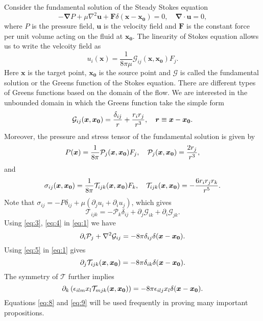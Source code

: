 \documentclass[12pt]{article}
\begin{document}
Consider the fundamental solution of the Steady Stokes equation
\begin{equation}
	\label{eq:1}
	-\boldsymbol{\nabla} P + \mu \nabla^2 \textbf{u} + \textbf{F} \delta(\boldsymbol{x}-\boldsymbol{x_0}) = 0, \quad
	\boldsymbol{\nabla}\cdot \textbf{u} = 0,
\end{equation}
where $P$ is the pressure field, $\textbf{u}$ is the velocity field and $\textbf{F}$ is the constant force per unit volume acting on the fluid at $\boldsymbol{x_0}$. The linearity of Stokes equation allows us to write the velcoity field as
\begin{equation}
	\label{eq:2}
	u_i(\boldsymbol{x}) = \frac{1}{8\pi\mu} \mathcal{G}_{ij}(\boldsymbol{x},\boldsymbol{x_0}) F_j.
\end{equation}
Here $\boldsymbol{x}$ is the target point, $\boldsymbol{x_0}$ is the source point and $\boldsymbol{\mathcal{G}}$ is called the fundamental solution or the Greens function of the Stokes equation. There are different types of Greens functions based on the domain of the flow. We are interested in the unbounded domain in which the Greens function take the simple form
\begin{equation}
	\label{eq:3}
	\mathcal{G}_{ij}(\boldsymbol{x}, \boldsymbol{x_0}) = \frac{\delta_{ij}}{r} + \frac{r_i r_j}{r^3}, \quad \boldsymbol{r}\equiv \boldsymbol{x} - \boldsymbol{x_0}. 
\end{equation}
Moreover, the pressure and stress tensor of the fundamental solution is given by
\begin{equation}
	\label{eq:4}
	P(\boldsymbol{x}) = \frac{1}{8\pi} \mathcal{P}_j(\boldsymbol{x},\boldsymbol{x_0}) F_j, \quad \mathcal{P}_j(\boldsymbol{x},\boldsymbol{x_0}) = \frac{2 r_j}{r^3},
\end{equation}
and 
\begin{equation}
	\label{eq:5}
	\sigma_{ij}(\boldsymbol{x},\boldsymbol{x_0}) = \frac{1}{8\pi} \mathcal{T}_{ijk}(\boldsymbol{x},\boldsymbol{x_0}) F_k, \quad \mathcal{T}_{ijk}(\boldsymbol{x},\boldsymbol{x_0}) = -\frac{6 r_i r_j r_k}{r^5}.
\end{equation}
Note that $\sigma_{ij} = -P\delta_{ij} + \mu (\partial_j u_i + \partial_i u_j)$, which gives
\begin{equation}
	\label{eq:6}
	\mathcal{T}_{ijk} = -\mathcal{P}_k \delta_{ij} + \partial_j \mathcal{G}_{ik} +  \partial_i \mathcal{G}_{jk}.
\end{equation}
Using \eqref{eq:3}, \eqref{eq:4} in \eqref{eq:1} we have
\begin{equation}
	\label{eq:7}
	\partial_i\mathcal{P}_j + \nabla^2\mathcal{G}_{ij} = -8\pi \delta_{ij} \delta(\boldsymbol{x} - \boldsymbol{x_0}).
\end{equation}
Using \eqref{eq:5} in \eqref{eq:1} gives
\begin{equation}
	\label{eq:8}
	\partial_j\mathcal{T}_{ijk}(\boldsymbol{x},\boldsymbol{x_0}) = -8\pi \delta_{ik}\delta(\boldsymbol{x} - \boldsymbol{x_0}).  
\end{equation}
The symmetry of $\mathcal{T}$ further implies
\begin{equation}
	\label{eq:9}
	\partial_k\left( \epsilon_{ilm} x_l \mathcal{T}_{mjk}(\boldsymbol{x},\boldsymbol{x_0}) \right) = -8\pi\epsilon_{ilj} x_l \delta(\boldsymbol{x} - \boldsymbol{x_0}). 
\end{equation}
Equations \eqref{eq:8} and \eqref{eq:9} will be used frequently in proving many important propositions.
\end{document}
